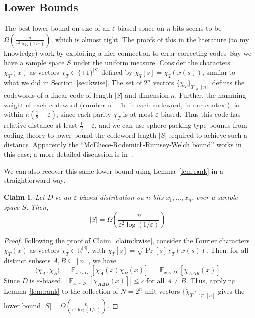 \documentclass[]{article}
\newtheorem{claim}[theorem]{Claim}
\newcommand{\1}{\mathbb{1}}
\newcommand{\R}{\mathbb{R}}
\newcommand{\E}{\mathop{\mathbb{E}}}
\renewcommand{\epsilon}{\varepsilon}
\newcommand{\innp}[1]{\langle #1 \rangle}
\renewcommand{\t}{\widetilde}
\begin{document}
\subsection{Lower Bounds}
The best lower bound on size of an $\epsilon$-biased space on $n$ bits seems to
be $\Omega(\frac{n}{\epsilon^2 \log(1/\epsilon)})$, which is almost tight.
The proofs of this in the literature (to my knowledge) work by exploiting a nice connection to
error-correcting codes:
Say we have a sample space $S$ under the uniform measure.
Consider the characters $\chi_T(x)$ as vectors $\t \chi_T \in \{\pm 1\}^{|S|}$
defined by $\t \chi_T[s] = \chi_T(x(s))$, similar to what we did in Section~\ref{sec:kwise}.
The set of $2^n$ vectors $\{\t \chi_T\}_{T \subseteq [n]}$
defines the codewords of a linear code
of length $|S|$ and dimension $n$.
Further, the hamming-weight of each codeword (number of $-1$s in each codeword,
in our context), is within $n(\frac{1}{2} \pm \epsilon)$,
since each parity $\chi_T$ is at most $\epsilon$-biased.
Thus this code has relative distance at least $\frac{1}{2} - \epsilon$,
and we can use sphere-packing-type bounds from coding-theory to lower-bound the
codeword length $|S|$ required to achieve such a distance.
Apparently the ``McEliece-Rodemich-Rumsey-Welch bound'' works in this case;
a more detailed discussion is in~\cite[Section 7]{alon92}.

We can also recover this same lower bound using Lemma~\ref{lem:rank} in a
straightforward way.

\begin{claim}
    \label{claim:epsbias}
    Let $D$ be an $\epsilon$-biased distribution on $n$ bits
    $x_1, \dots, x_n$, over a sample space $S$.
    Then,
$$|S| = \Omega\left(\frac{n}{\epsilon^2 \log(1/\epsilon)}\right)$$
\end{claim}
\begin{proof}
Following the proof of Claim~\ref{claim:kwise},
consider the Fourier characters $\chi_T(x)$
as vectors $\t \chi_T \in \R^{|S|}$, with
$\t \chi_T[s] = \sqrt{\Pr[s]} \chi_T(x(s))$.
Then, for all distinct subsets $A, B \subseteq [n]$, we have
$$\innp{\t \chi_A, \t \chi_B} = \E_{x \sim D}[\chi_A(x)\chi_B(x)] = \E_{x \sim D}[\chi_{A \Delta B}(x)]$$
Since $D$ is $\epsilon$-biased,
$\left|\E_{x \sim D}[\chi_{A \Delta B}(x)]\right| \leq \epsilon$
for all $A \neq B$.
Thus, applying Lemma~\ref{lem:rank} to the collection of $N = 2^n$ unit vectors
$\{\t \chi_T\}_{T \subseteq [n]}$ gives the lower bound
$|S| = \Omega\left(\frac{n}{\epsilon^2 \log(1/\epsilon)}\right)$.
\end{proof}
\end{document}

